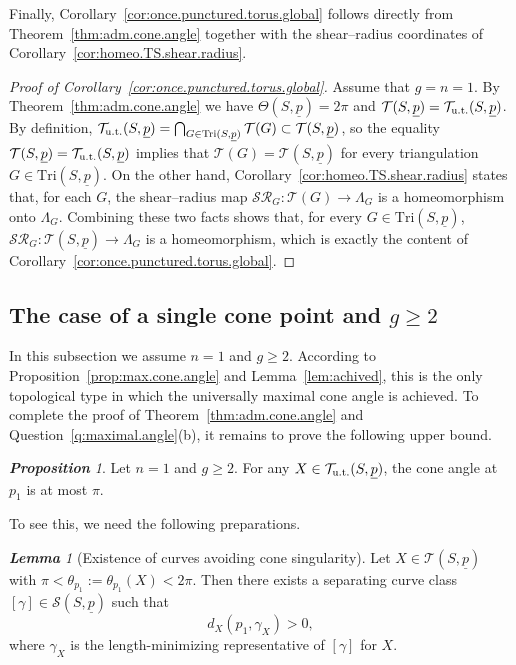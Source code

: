 \documentclass[11pt, letterpaper]{amsart}
\theoremstyle{definition}
\theoremstyle{remark}
\newtheorem{proposition}[theorem]{\rm\bf Proposition}
\newtheorem{lemma}[theorem]{\rm\bf Lemma}
\newcommand{\up}{\underline{p}}
\newcommand{\Sp}{(S,\up)}
\newcommand{\TSp}{\text{Tri}\Sp}
\newcommand{\cSR}{\mathcal{SR}}
\newcommand{\cT}{\mathcal{T}}
\newcommand{\cTp}{\mathcal{T} (S,\up)}
\newcommand{\cS}{\mathcal{S}}
\numberwithin{equation}{section}
\begin{document}
Finally, Corollary~\ref{cor:once.punctured.torus.global} follows directly from Theorem~\ref{thm:adm.cone.angle} together with the shear--radius coordinates of Corollary~\ref{cor:homeo.TS.shear.radius}.

\begin{proof}[Proof of Corollary~\ref{cor:once.punctured.torus.global}]
Assume that \(g = n = 1\).
By Theorem~\ref{thm:adm.cone.angle} we have \(\Theta\Sp = 2\pi\) and \(\cTp = \cT_{\rm u.t.}\Sp\).
By definition, \(\cT_{\rm u.t.}\Sp = \bigcap_{G \in \TSp} \cT(G) \subset \cTp\), so the equality \(\cTp = \cT_{\rm u.t.}\Sp\) implies that \(\cT(G) = \cTp\) for every triangulation \(G \in \TSp\).
On the other hand, Corollary~\ref{cor:homeo.TS.shear.radius} states that, for each \(G\), the shear--radius map
\(\cSR_G : \cT(G) \longrightarrow \Lambda_G\) is a homeomorphism onto \(\Lambda_G\).
Combining these two facts shows that, for every \(G \in \TSp\),
\(\cSR_G : \cTp \to \Lambda_G\) is a homeomorphism, which is exactly the content of Corollary~\ref{cor:once.punctured.torus.global}.
\end{proof}


 \subsection{The case of a single cone point and $g \geq 2$}
\label{subsec:case3}
In this subsection we assume \(n=1\) and \(g\ge 2\).
According to Proposition~\ref{prop:max.cone.angle} and
Lemma~\ref{lem:achived}, this is the only topological type in which the
universally maximal cone angle is achieved.
To complete the proof of Theorem~\ref{thm:adm.cone.angle} and
Question~\ref{q:maximal.angle}(b), it remains to prove the following
upper bound.

\begin{proposition}\label{prop:n1ggeq2.cone.angle}
  Let \(n=1\) and \(g\geq 2\). For any \(X\in\cT_{\rm u.t.}\Sp\), the cone angle at \(p_1\) is at most \(\pi\).  
\end{proposition}

To see this, we need the following preparations.

\begin{lemma}[Existence of curves avoiding cone singularity]
\label{lem:dist.bt.zero}
Let \(X\in\cT\Sp\) with \(\pi<\theta_{p_1}:=\theta_{p_1}(X)<2\pi\).
Then there exists a separating curve class \([\gamma]\in\cS\Sp\) such that
\[
d_X(p_1,\gamma_X)>0,
\]
where \(\gamma_X\) is the length-minimizing representative of \([\gamma]\) for \(X\).
\end{lemma}
\end{document}
